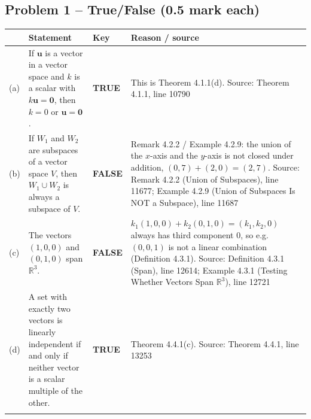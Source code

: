 \documentclass[11pt,a4paper]{article}
\newcommand{\Src}[1]{{\footnotesize\color{black!65}Source: #1}}
\begin{document}
\subsection*{Problem 1 -- True/False (0.5 mark each)}
\begin{tabularx}{\linewidth}{@{}l X l X@{}}\toprule & Statement & Key & Reason / source\\\midrule
(a) & If $\mathbf{u}$ is a vector in a vector space and $k$ is a scalar with $k\mathbf{u}=\mathbf{0}$, then $k=0$ or $\mathbf{u}=\mathbf{0}$. & \textbf{TRUE} & This is Theorem 4.1.1(d). \Src{Theorem 4.1.1, line 10790}\\\addlinespace
(b) & If $W_1$ and $W_2$ are subspaces of a vector space $V$, then $W_1\cup W_2$ is always a subspace of $V$. & \textbf{FALSE} & Remark 4.2.2 / Example 4.2.9: the union of the $x$-axis and the $y$-axis is not closed under addition, $(0,7)+(2,0)=(2,7)$. \Src{Remark 4.2.2 (Union of Subspaces), line 11677; Example 4.2.9 (Union of Subspaces Is NOT a Subspace), line 11687}\\\addlinespace
(c) & The vectors $(1,0,0)$ and $(0,1,0)$ span $\mathbb{R}^3$. & \textbf{FALSE} & $k_1(1,0,0)+k_2(0,1,0)=(k_1,k_2,0)$ always has third component $0$, so e.g. $(0,0,1)$ is not a linear combination (Definition 4.3.1). \Src{Definition 4.3.1 (Span), line 12614; Example 4.3.1 (Testing Whether Vectors Span $\mathbb{R}^3$), line 12721}\\\addlinespace
(d) & A set with exactly two vectors is linearly independent if and only if neither vector is a scalar multiple of the other. & \textbf{TRUE} & Theorem 4.4.1(c). \Src{Theorem 4.4.1, line 13253}\\\addlinespace
\bottomrule\end{tabularx}
\end{document}
